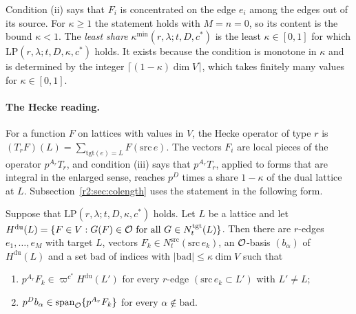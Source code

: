 Condition (ii) says that $F_i$ is concentrated on the edge $e_i$ among the edges out of its source. For $\kappa\ge1$ the statement holds with $M=n=0$, so its content is the bound $\kappa<1$. The \emph{least share} $\kappa^{\min}(r,\lambda;t,D,c^*)$ is the least $\kappa\in[0,1]$ for which $\mathrm{LP}(r,\lambda;t,D,\kappa,c^*)$ holds. It exists because the condition is monotone in $\kappa$ and is determined by the integer $\lceil(1-\kappa)\dim V\rceil$, which takes finitely many values for $\kappa\in[0,1]$.

\paragraph{The Hecke reading.} For a function $F$ on lattices with values in $V$, the Hecke operator of type $r$ is $(T_rF)(L)=\sum_{\mathrm{tgt}(e)=L}F(\mathrm{src}\,e)$. The vectors $F_i$ are local pieces of the operator $p^{A_r}T_r$, and condition (iii) says that $p^{A_r}T_r$, applied to forms that are integral in the enlarged sense, reaches $p^D$ times a share $1-\kappa$ of the dual lattice at $L$. Subsection~\ref{r2:sec:colength} uses the statement in the following form.

\begin{lemma}\label{r2:smithlocal}
Suppose that $\mathrm{LP}(r,\lambda;t,D,\kappa,c^*)$ holds. Let $L$ be a lattice and let $H^{\mathrm{du}}(L)=\{F\in V:G(F)\in\mathcal O\text{ for all }G\in N^{\mathrm{tgt}}_t(L)\}$. Then there are $r$-edges $e_1,\dots,e_M$ with target $L$, vectors $F_k\in N^{\mathrm{src}}_t(\mathrm{src}\,e_k)$, an $\mathcal O$-basis $(b_\alpha)$ of $H^{\mathrm{du}}(L)$ and a set $\mathrm{bad}$ of indices with $\lvert\mathrm{bad}\rvert\le\kappa\dim V$ such that
\begin{enumerate}
\item[(a)] $p^{A_r}F_k\in\varpi^{c^*}H^{\mathrm{du}}(L')$ for every $r$-edge $(\mathrm{src}\,e_k\subset L')$ with $L'\ne L$;
\item[(b)] $p^Db_\alpha\in\operatorname{span}_\mathcal O\{p^{A_r}F_k\}$ for every $\alpha\notin\mathrm{bad}$.
\end{enumerate}
\end{lemma}


